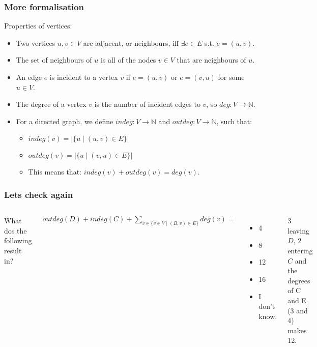 \begin{frame}
	\frametitle{More formalisation}
Properties of vertices:
		\begin{itemize}
			\item Two vertices $u,v \in V$ are adjacent, or neighbours, iff $\exists e \in E$ s.t. $e=(u,v)$.
				
			\item The set of neighbours of $u$ is all of the nodes $v \in V$ that are neighbours of $u$.
				
			\item An edge $e$ is incident to a vertex $v$ if $e=(u,v)$ or $e = (v,u)$ for some $u \in V$.
				
			\item The \alert{degree} of a vertex $v$ is the number of incident edges to $v$, so $\mathit{deg}: V \to \mathbb{N}$.
				
			\item For a directed graph, we define $\mathit{indeg}: V \to \mathbb{N}$ and $\mathit{outdeg}: V \to \mathbb{N}$,
				such that:
				
				\begin{itemize}
					\item $\mathit{indeg}(v) = | \{u \mid (u,v) \in E\}|$
					\item $\mathit{outdeg}(v) = | \{u \mid (v,u) \in E\}|$
						
					\item This means that: $\mathit{indeg}(v) + \mathit{outdeg}(v) = \mathit{deg}(v)$.
				\end{itemize}
		\end{itemize}
\end{frame}

\begin{frame}
	\frametitle{Lets check again}
	\begin{columns}[T]
			
What dos the following result in?
	
		$\mathit{outdeg}(D) + \mathit{indeg}(C) + \sum\limits_{v\in \{v \in V \mid (B,v) \in E\}} \mathit{deg}(v) = $
		\begin{itemize}
			\item 4
			\item 8
			\item 12
			\item 16
			\item I don't know.
		\end{itemize}
	
		3 leaving $D$, 2 entering $C$ and the degrees of C and E (3 and 4) makes 12.
	\end{columns}
\end{frame}

